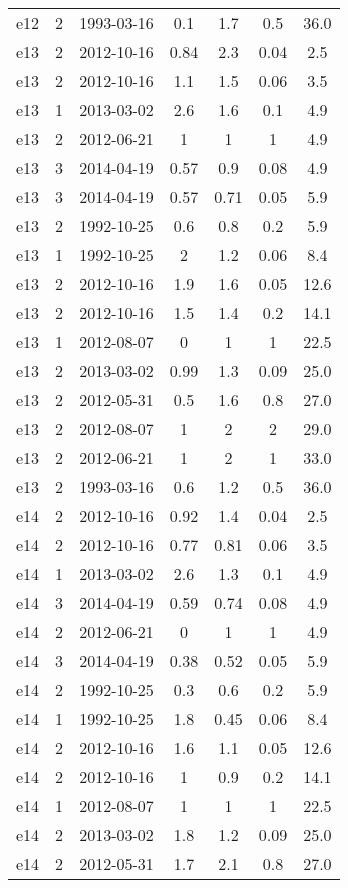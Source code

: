 \begin{table*}[htp]
\begin{tabular}{ccccccc}
e12 & 2 & 1993-03-16 & 0.1 & 1.7 & 0.5 & 36.0 \\
e13 & 2 & 2012-10-16 & 0.84 & 2.3 & 0.04 & 2.5 \\
e13 & 2 & 2012-10-16 & 1.1 & 1.5 & 0.06 & 3.5 \\
e13 & 1 & 2013-03-02 & 2.6 & 1.6 & 0.1 & 4.9 \\
e13 & 2 & 2012-06-21 & 1 & 1 & 1 & 4.9 \\
e13 & 3 & 2014-04-19 & 0.57 & 0.9 & 0.08 & 4.9 \\
e13 & 3 & 2014-04-19 & 0.57 & 0.71 & 0.05 & 5.9 \\
e13 & 2 & 1992-10-25 & 0.6 & 0.8 & 0.2 & 5.9 \\
e13 & 1 & 1992-10-25 & 2 & 1.2 & 0.06 & 8.4 \\
e13 & 2 & 2012-10-16 & 1.9 & 1.6 & 0.05 & 12.6 \\
e13 & 2 & 2012-10-16 & 1.5 & 1.4 & 0.2 & 14.1 \\
e13 & 1 & 2012-08-07 & 0 & 1 & 1 & 22.5 \\
e13 & 2 & 2013-03-02 & 0.99 & 1.3 & 0.09 & 25.0 \\
e13 & 2 & 2012-05-31 & 0.5 & 1.6 & 0.8 & 27.0 \\
e13 & 2 & 2012-08-07 & 1 & 2 & 2 & 29.0 \\
e13 & 2 & 2012-06-21 & 1 & 2 & 1 & 33.0 \\
e13 & 2 & 1993-03-16 & 0.6 & 1.2 & 0.5 & 36.0 \\
e14 & 2 & 2012-10-16 & 0.92 & 1.4 & 0.04 & 2.5 \\
e14 & 2 & 2012-10-16 & 0.77 & 0.81 & 0.06 & 3.5 \\
e14 & 1 & 2013-03-02 & 2.6 & 1.3 & 0.1 & 4.9 \\
e14 & 3 & 2014-04-19 & 0.59 & 0.74 & 0.08 & 4.9 \\
e14 & 2 & 2012-06-21 & 0 & 1 & 1 & 4.9 \\
e14 & 3 & 2014-04-19 & 0.38 & 0.52 & 0.05 & 5.9 \\
e14 & 2 & 1992-10-25 & 0.3 & 0.6 & 0.2 & 5.9 \\
e14 & 1 & 1992-10-25 & 1.8 & 0.45 & 0.06 & 8.4 \\
e14 & 2 & 2012-10-16 & 1.6 & 1.1 & 0.05 & 12.6 \\
e14 & 2 & 2012-10-16 & 1 & 0.9 & 0.2 & 14.1 \\
e14 & 1 & 2012-08-07 & 1 & 1 & 1 & 22.5 \\
e14 & 2 & 2013-03-02 & 1.8 & 1.2 & 0.09 & 25.0 \\
e14 & 2 & 2012-05-31 & 1.7 & 2.1 & 0.8 & 27.0 \\

\end{tabular}
\end{table*}
